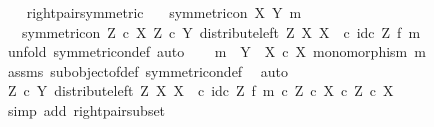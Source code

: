 \begin{isabellebody}
\ \ \isamarkupfalse%
\isanewline
{}\isamarkupfalse%
%
\endisatagproof
{\isafoldproof}%
%
\isadelimproof
\isanewline
%
\endisadelimproof
\isanewline
{}\isamarkupfalse%
\ right{\isacharunderscore}{\kern0pt}pair{\isacharunderscore}{\kern0pt}symmetric{\isacharcolon}{\kern0pt}\isanewline
\ \ \ {\isachardoublequoteopen}symmetric{\isacharunderscore}{\kern0pt}on\ X\ {\isacharparenleft}{\kern0pt}Y{\isacharcomma}{\kern0pt}\ m{\isacharparenright}{\kern0pt}{\isachardoublequoteclose}\isanewline
\ \ \ {\isachardoublequoteopen}symmetric{\isacharunderscore}{\kern0pt}on\ {\isacharparenleft}{\kern0pt}Z\ {\isasymtimes}\isactrlsub c\ X{\isacharparenright}{\kern0pt}\ {\isacharparenleft}{\kern0pt}Z\ {\isasymtimes}\isactrlsub c\ Y{\isacharcomma}{\kern0pt}\ distribute{\isacharunderscore}{\kern0pt}left\ Z\ X\ X\ \ {\isasymcirc}\isactrlsub c\ {\isacharparenleft}{\kern0pt}id\isactrlsub c\ Z\ {\isasymtimes}\isactrlsub f\ m{\isacharparenright}{\kern0pt}{\isacharparenright}{\kern0pt}{\isachardoublequoteclose}\isanewline
%
\isadelimproof
%
\endisadelimproof
%
\isatagproof
{}\isamarkupfalse%
\ {\isacharparenleft}{\kern0pt}unfold\ symmetric{\isacharunderscore}{\kern0pt}on{\isacharunderscore}{\kern0pt}def{\isacharcomma}{\kern0pt}\ auto{\isacharparenright}{\kern0pt}\isanewline
\ \ \isamarkupfalse%
\ {\isachardoublequoteopen}m\ {\isacharcolon}{\kern0pt}\ Y\ {\isasymrightarrow}\ X\ {\isasymtimes}\isactrlsub c\ X{\isachardoublequoteclose}\ {\isachardoublequoteopen}monomorphism\ m{\isachardoublequoteclose}\isanewline
\ \ \ \ \isamarkupfalse%
\ assms\ subobject{\isacharunderscore}{\kern0pt}of{\isacharunderscore}{\kern0pt}def{}\ symmetric{\isacharunderscore}{\kern0pt}on{\isacharunderscore}{\kern0pt}def\ \isamarkupfalse%
\ auto\isanewline
\ \ \isamarkupfalse%
\ \isamarkupfalse%
\ {\isachardoublequoteopen}{\isacharparenleft}{\kern0pt}Z\ {\isasymtimes}\isactrlsub c\ Y{\isacharcomma}{\kern0pt}\ distribute{\isacharunderscore}{\kern0pt}left\ Z\ X\ X\ \ {\isasymcirc}\isactrlsub c\ {\isacharparenleft}{\kern0pt}id\isactrlsub c\ Z\ {\isasymtimes}\isactrlsub f\ m{\isacharparenright}{\kern0pt}{\isacharparenright}{\kern0pt}\ {\isasymsubseteq}\isactrlsub c\ {\isacharparenleft}{\kern0pt}Z\ {\isasymtimes}\isactrlsub c\ X{\isacharparenright}{\kern0pt}\ {\isasymtimes}\isactrlsub c\ Z\ {\isasymtimes}\isactrlsub c\ X{\isachardoublequoteclose}\isanewline
\ \ \ \ \isamarkupfalse%
\ {\isacharparenleft}{\kern0pt}simp\ add{\isacharcolon}{\kern0pt}\ right{\isacharunderscore}{\kern0pt}pair{\isacharunderscore}{\kern0pt}subset{\isacharparenright}{\kern0pt}\isanewline

\end{isabellebody}

